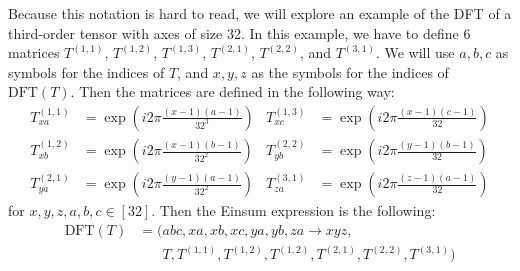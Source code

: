 Because this notation is hard to read, we will explore an example of the DFT of a third-order tensor with axes of size 32.
In this example, we have to define 6 matrices $T^{(1,1)}$, $T^{(1,2)}$, $T^{(1,3)}$, $T^{(2,1)}$, $T^{(2, 2)}$, and $T^{(3,1)}$.
We will use $a,b,c$ as symbols for the indices of $T$, and $x,y,z$ as the symbols for the indices of $\text{DFT}(T)$.
Then the matrices are defined in the following way:
\begin{align*}
    T^{(1,1)}_{xa} & = \exp\left(i2\pi \frac{(x - 1)(a - 1)}{32^3}\right) & T^{(1,3)}_{xc} & = \exp\left(i2\pi \frac{(x - 1)(c - 1)}{32}\right) \\
    T^{(1,2)}_{xb} & = \exp\left(i2\pi \frac{(x - 1)(b - 1)}{32^2}\right) & T^{(2,2)}_{yb} & = \exp\left(i2\pi \frac{(y - 1)(b - 1)}{32}\right) \\
    T^{(2,1)}_{ya} & = \exp\left(i2\pi \frac{(y - 1)(a - 1)}{32^2}\right) & T^{(3,1)}_{za} & = \exp\left(i2\pi \frac{(z - 1)(a - 1)}{32}\right)
\end{align*}
for $x, y, z, a, b, c \in [32]$.
Then the Einsum expression is the following:
\begin{align*}
    \text{DFT}(T) & = (abc, xa, xb, xc, ya, yb, za \rightarrow xyz,                                     \\
                  & \phantom{{}=(} T, T^{(1,1)}, T^{(1,2)}, T^{(1,2)}, T^{(2,1)}, T^{(2,2)}, T^{(3,1)})
\end{align*}